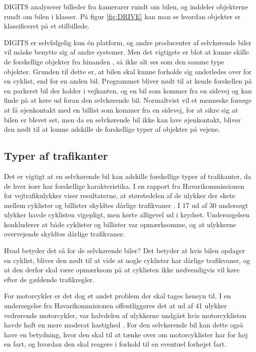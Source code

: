 DIGITS analyserer billeder fra kamerarer rundt om bilen, og inddeler objekterne rundt om bilen i klasser. På figur \ref{fig:DRIVE} kan man se hvordan objekter er klassificeret på et stilbillede.

DIGITS er selvfølgelig kun \'en platform, og andre producenter af selvkørende biler vil måske benytte sig af andre systemer. Men det vigtigste er blot at kunne skille de forskellige objekter fra hinanden \cite{cnet}, så ikke alt ses som den samme type objekter. Grunden til dette er, at bilen skal kunne forholde sig anderledes over for en cyklist, end for en anden bil. Programmet bliver nødt til at kende forskellen på en parkeret bil der holder i vejkanten, og en bil som kommer fra en sidevej og kan finde på at køre ud foran den selvkørende bil. Normaltvist vil et menneske forsøge at få øjenkontakt med en billist som kommer fra en sidevej, for at sikre sig at bilen er blevet set, men da en selvkørende bil ikke kan lave øjenkontakt, bliver den nødt til at kunne adskille de forskellige typer af objekter på vejene.

\subsection{Typer af trafikanter}
Det er vigtigt at en selvkørende bil kan adskille forskellige typer af trafikanter, da de hver især har forskellige karakteristika. I en rapport fra Havarikommissionen for vejtrafikulykker viser resultaterne, at størstedelen af de ulykker der skete mellem cyklister og billister skyldtes dårlige trafikvaner \cite{HVU}. I 17 ud af 30 undersøgt ulykker havde cyklisten vigepligt, men kørte alligevel ud i krydset. Undersøgelsen konkluderer at både cyklister og billister var opmærksomme, og at ulykkerne overvejende skyldtes dårlige trafikvaner. 

Hvad betyder det så for de selvkørende biler? Det betyder at hvis bilen opdager en cyklist, bliver den nødt til at vide at nogle cyklister har dårlige trafikvaner, og at den derfor skal være opmærksom på at cyklisten ikke nødvendigvis vil køre efter de gældende trafikregler. 

For motorcykler er det dog et andet problem der skal tages hensyn til.  I en undersøgelse fra Havarikommisionen offentliggøres det at ud af 41 ulykker vedrørende motorcykler, var halvdelen af ulykkerne undgået hvis motorcyklisten havde haft en mere moderat hastighed \cite{MOT}. For den selvkørende bil kan dette også have en betydning, hvor den skal til at tænke over om motorcyklister har for høj en fart, og hvordan den skal reagere i forhold til en eventuel forhøjet fart.

